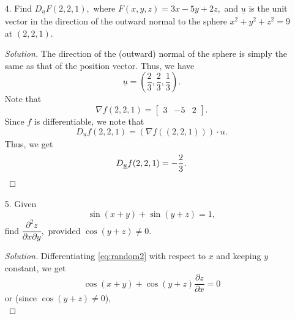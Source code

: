 \documentclass[12pt]{article}
\theoremstyle{definition}
\newenvironment{soln}{\begin{proof}[Solution]}{\end{proof}}
\begin{document}
\begin{itemize}
\begin{soln}
		Thus, the two directions are
		\begin{equation*} 
			\begin{bmatrix}
				0 & 1
			\end{bmatrix} \quad\text{and}\quad \begin{bmatrix}
				\frac{4}{5} & -\frac{3}{5}
			\end{bmatrix}. \qedhere
		\end{equation*}
	\end{soln}
	\newpage
	\item[4.] Find $D_{\underline{u}}F(2, 2, 1),$ where $F(x, y, z) = 3x - 5y + 2z,$ and $\underline{u}$ is the unit vector in the direction of the outward normal to the sphere $x^2 + y^2 + z^2 = 9$ at $(2, 2, 1).$
	\begin{soln}
		The direction of the (outward) normal of the sphere is simply the same as that of the position vector. Thus, we have
		\begin{equation*} 
			\underline{u} = \left(\dfrac{2}{3}, \dfrac{2}{3}, \dfrac{1}{3}\right).
		\end{equation*}
		Note that
		\begin{equation*} 
			\nabla f(2, 2, 1) = \begin{bmatrix}
				3 & -5 & 2
			\end{bmatrix}.
		\end{equation*}
		Since $f$ is differentiable, we note that
		\begin{equation*} 
			D_{\underline{u}}f(2, 2, 1) = (\nabla f((2, 2, 1)))\cdot u.
		\end{equation*}
		Thus, we get
		\begin{equation*} 
			D_{\underline{u}}f(2, 2, 1) = -\dfrac{2}{3}. \qedhere
		\end{equation*}
	\end{soln}
	\newpage
	\item[5.] Given 
	\begin{equation} \tag{$*$} \label{eq:random2}
		\sin(x + y) + \sin(y + z) = 1,
	\end{equation} find $\dfrac{\partial^2z}{\partial x\partial y},$ provided $\cos(y + z) \neq 0.$
	\begin{soln}
		Differentiating \cref{eq:random2} with respect to $x$ and keeping $y$ constant, we get
		\begin{equation*} 
			\cos(x + y) + \cos(y + z)\frac{\partial z}{\partial x} = 0
		\end{equation*}
		or (since $\cos(y + z) \neq 0$),
		\begin{equation} \tag{$\star$} \label{eq:random3}

\end{equation}
\end{soln}
\end{itemize}
\end{document}
